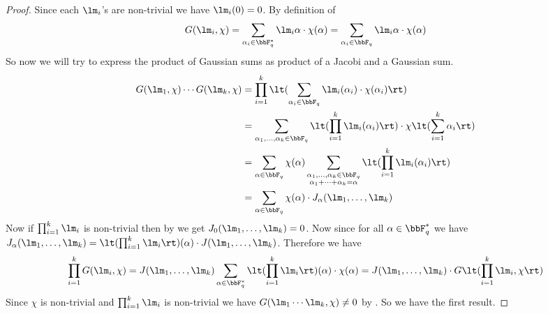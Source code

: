\begin{proof}
  Since each $\lm_i$'s are non-trivial we have $\lm_i(0)=0$. By definition of $$G(\lm_i,\chi)=\sum_{\alpha_i\in\bbF_q^*}\lm_i{\alpha}\cdot \chi(\alpha)=\sum_{\alpha_i\in\bbF_q}\lm_i{\alpha}\cdot \chi(\alpha)$$So now we will try to express the product of Gaussian sums as product of a Jacobi and a Gaussian sum. 
  \begin{align}
    G(\lm_1,\chi)\cdots G(\lm_k,\chi) & = \prod_{i=1}^k \lt(\sum_{\alpha_i\in\bbF_q}\lm_i(\alpha_i)\cdot \chi(\alpha_i)\rt) \nonumber\\
    & = \sum_{\alpha_1,\dots,\alpha_k\in\bbF_q}\lt( \prod_{i=1}^k\lm_i(\alpha_i) \rt) \cdot \chi\lt( \sum_{i=1}^k \alpha_i \rt)\nonumber\\
    & =\sum_{\alpha\in\bbF_q}\chi(\alpha)\sum_{\substack{\alpha_1,\dots,\alpha_k\in\bbF_q\\ \alpha_1+\cdots+\alpha_k=\alpha}}\lt( \prod_{i=1}^k\lm_i(\alpha_i) \rt)\nonumber\\
    & = \sum_{\alpha\in\bbF_q}\chi(\alpha)\cdot J_{\alpha}(\lm_1,\dots,\lm_k)\label{eq:gauss-prod-jacobi-sum}
  \end{align}
  Now if $\prod_{i=1}^k \lm_i$ is non-trivial then by  we get $J_0(\lm_1,\dots, \lm_k)=0$. Now since for all $\alpha\in\bbF_q^*$ we have $J_{\alpha}(\lm_1,\dots,\lm_k)=\lt(\prod_{i=1}^k\lm_i\rt)(\alpha)\cdot J(\lm_1,\dots,\lm_k)$. Therefore we have $$\prod_{i=1}^k G(\lm_i,\chi)=J(\lm_1,\dots,\lm_k)\sum_{\alpha\in\bbF_q^*}\lt(\prod_{i=1}^k\lm_i\rt)(\alpha)\cdot \chi(\alpha)= J(\lm_1,\dots,\lm_k)\cdot G\lt(\prod_{i=1}^k\lm_i,\chi\rt)$$Since $\chi$ is non-trivial and $\prod_{i=1}^k\lm_i$ is non-trivial we have $G(\lm_1\cdots\lm_k,\chi)\neq 0$ by . So we have the first result. 


\end{proof}
